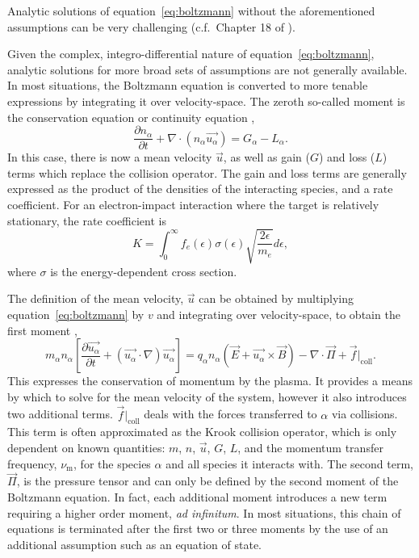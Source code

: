 Analytic solutions of equation~\ref{eq:boltzmann} without the aforementioned
assumptions can be very challenging (c.f.\ Chapter 18 of \cite{Lieberman2005}).

Given the complex, integro-differential nature of equation~\ref{eq:boltzmann},
analytic solutions for more broad sets of assumptions are not generally
available. In most situations, the Boltzmann equation is converted to more
tenable expressions by integrating it over velocity-space. The zeroth so-called
moment is the conservation equation or continuity equation \cite{Lieberman2005},
\begin{equation}\label{eq:cont}
  \frac{\partial n_\alpha}{\partial t} + \nabla \cdot (n_\alpha \vec{u_\alpha})
  = G_\alpha - L_\alpha.
\end{equation}
In this case, there is now a mean velocity $\vec{u}$, as well as gain ($G$) and
loss ($L$) terms which replace the collision operator. The gain and loss terms
are generally expressed as the product of the densities of the interacting
species, and a rate coefficient. For an electron-impact interaction where the
target is relatively stationary, the rate coefficient is
\begin{equation}
  K = \int_0^\infty f_e(\epsilon)\sigma(\epsilon)
      \sqrt{\frac{2\epsilon}{m_e}}d\epsilon,
  \label{eq:rate}
\end{equation}
where $\sigma$ is the energy-dependent cross section.

The definition of the mean velocity, $\vec{u}$ can be obtained by multiplying
equation~\ref{eq:boltzmann} by $v$ and integrating over velocity-space, to
obtain the first moment \cite{Lieberman2005},
\begin{equation}
  m_\alpha n_\alpha \left[ \frac{\partial \vec{u_\alpha}}{\partial t}
  + (\vec{u_\alpha} \cdot \nabla) \vec{u_\alpha}\right]
  = q_\alpha n_\alpha (\vec{E} + \vec{u_\alpha} \times \vec{B})
  - \nabla \cdot \vec{\Pi} + \vec{f}|_\mathrm{coll}.
  \label{eq:momentum}
\end{equation}
This expresses the conservation of momentum by the plasma. It provides a means
by which to solve for the mean velocity of the system, however it also
introduces two additional terms. $\vec{f}|_\mathrm{coll}$ deals with the forces
transferred to $\alpha$ via collisions. This term is often approximated as the
Krook collision operator, which is only dependent on known quantities: $m$, $n$,
$\vec{u}$, $G$, $L$, and the momentum transfer frequency, $\nu_\mathrm{m}$, for
the species $\alpha$ and all species it interacts with. The second term,
$\vec{\Pi}$, is the pressure tensor and can only be defined by the second moment
of the Boltzmann equation. In fact, each additional moment introduces a new term
requiring a higher order moment, \emph{ad infinitum}. In most situations, this
chain of equations is terminated after the first two or three moments by the use
of an additional assumption such as an equation of state.

